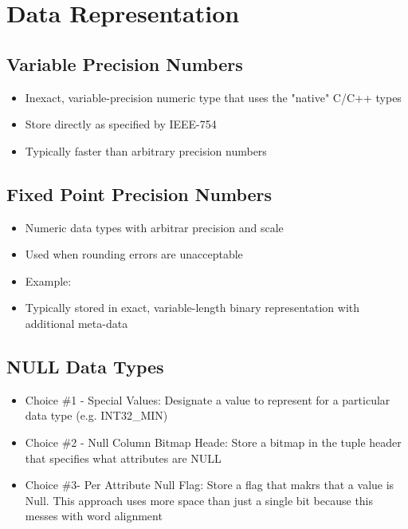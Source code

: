 \documentclass[11pt]{article}
\begin{document}
\section{Data Representation}
    \subsection*{Variable Precision Numbers}
    \begin{itemize}
        \item Inexact, variable-precision numeric type that uses the "native" C/C++ types
        \item Store directly as specified by IEEE-754
        \item Typically faster than arbitrary precision numbers
    \end{itemize}

    \subsection*{Fixed Point Precision Numbers}
    \begin{itemize}
        \item Numeric data types with arbitrar precision and scale
        \item Used when rounding errors are unacceptable
        \item Example: 
        \item Typically stored in exact, variable-length binary representation with additional meta-data
    \end{itemize}

    \subsection*{NULL Data Types}
    \begin{itemize}
        \item Choice \#1 - Special Values: Designate a value to represent  for a particular data type (e.g. INT32\_MIN)
        \item Choice \#2 - Null Column Bitmap Heade: Store a bitmap in the tuple header that specifies what attributes are NULL
        \item Choice \#3- Per Attribute Null Flag: Store a flag that makrs that a value is Null. This approach uses more space than just a single bit because this messes with word alignment
    \end{itemize}
\end{document}
